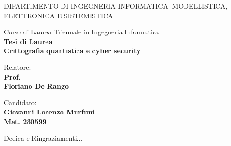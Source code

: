 \documentclass[a4paper,12pt,oneside]{book} %
\newenvironment{dedication}
  {\clearpage           %
   \thispagestyle{empty}%
   \vspace*{\stretch{1}}%
   \itshape             %
   \raggedleft          %
  }
   {\par %
   \vspace{\stretch{3}} %
   \clearpage           %
  }
\begin{document}
\begin{titlepage}
    \begin{center}
    \vspace*{0.2cm}
    \begin{figure}[H]
        \centering
    \end{figure}
        \vspace{5mm}
    	\uppercase{\normalsize Dipartimento di Ingegneria Informatica, Modellistica, Elettronica e Sistemistica}\\
    \end{center}
    \begin{center}
    	\large{ Corso di Laurea Triennale in Ingegneria Informatica}\\
        \vspace{3mm}
        \large{\bf Tesi di Laurea}\\
    	\vspace{10mm}
    {\LARGE{\bf Crittografia quantistica e cyber security}}\\	
     \vspace{7mm}
    \end{center}
    
    \vspace{25mm}
    \noindent
    \begin{minipage}[t]{0.47\textwidth}
    	{\large{ Relatore:\vspace*{0.22cm}\\\bf Prof. \\Floriano De Rango}}
    	\vspace{12mm}
    \end{minipage}
    \hfill
    \begin{minipage}[t]{0.4\textwidth}\raggedleft
    	{\large{Candidato: \\ \bf Giovanni Lorenzo Murfuni\\ Mat. 230599}}
    \end{minipage}
    
    \vspace{30mm}
    

\end{titlepage}

\begin{dedication}
Dedica e Ringraziamenti...
\end{dedication}
\end{document}
